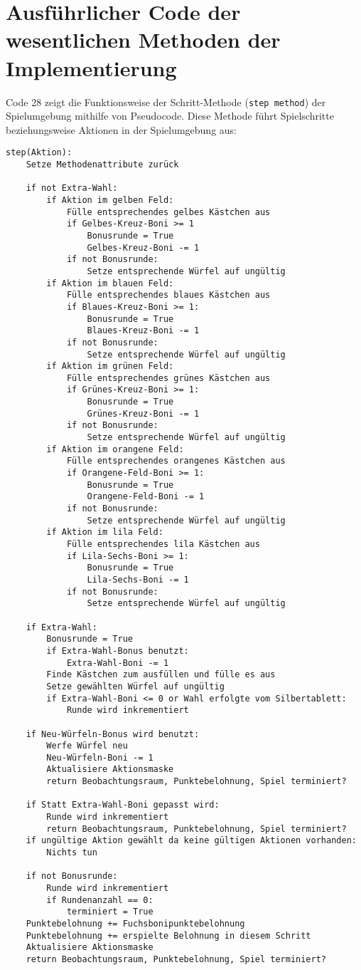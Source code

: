 \section{Ausführlicher Code der wesentlichen Methoden der Implementierung}
Code 28 zeigt die Funktionsweise der Schritt-Methode (\texttt{step method}) der Spielumgebung mithilfe von Pseudocode. Diese Methode führt Spielschritte beziehungsweise Aktionen in der Spielumgebung aus:
\vspace{0.5cm}
\begin{lstlisting}[caption={Schritt-Methode},morekeywords={Aktion}]
step(Aktion):
	Setze Methodenattribute zurück
	
	if not Extra-Wahl:
		if Aktion im gelben Feld:
			Fülle entsprechendes gelbes Kästchen aus
			if Gelbes-Kreuz-Boni >= 1
				Bonusrunde = True
				Gelbes-Kreuz-Boni -= 1
			if not Bonusrunde:
				Setze entsprechende Würfel auf ungültig
		if Aktion im blauen Feld:
			Fülle entsprechendes blaues Kästchen aus
			if Blaues-Kreuz-Boni >= 1:
				Bonusrunde = True
				Blaues-Kreuz-Boni -= 1
			if not Bonusrunde:
				Setze entsprechende Würfel auf ungültig
		if Aktion im grünen Feld:
			Fülle entsprechendes grünes Kästchen aus
			if Grünes-Kreuz-Boni >= 1:
				Bonusrunde = True
				Grünes-Kreuz-Boni -= 1
			if not Bonusrunde:
				Setze entsprechende Würfel auf ungültig
		if Aktion im orangene Feld:
			Fülle entsprechendes orangenes Kästchen aus
			if Orangene-Feld-Boni >= 1:
				Bonusrunde = True
				Orangene-Feld-Boni -= 1
			if not Bonusrunde:
				Setze entsprechende Würfel auf ungültig
		if Aktion im lila Feld:
			Fülle entsprechendes lila Kästchen aus
			if Lila-Sechs-Boni >= 1:
				Bonusrunde = True
				Lila-Sechs-Boni -= 1
			if not Bonusrunde:
				Setze entsprechende Würfel auf ungültig
	
	if Extra-Wahl:
		Bonusrunde = True
		if Extra-Wahl-Bonus benutzt:
			Extra-Wahl-Boni -= 1
		Finde Kästchen zum ausfüllen und fülle es aus
		Setze gewählten Würfel auf ungültig
		if Extra-Wahl-Boni <= 0 or Wahl erfolgte vom Silbertablett:
			Runde wird inkrementiert
	
	if Neu-Würfeln-Bonus wird benutzt:
		Werfe Würfel neu
		Neu-Würfeln-Boni -= 1
		Aktualisiere Aktionsmaske
		return Beobachtungsraum, Punktebelohnung, Spiel terminiert?
	
	if Statt Extra-Wahl-Boni gepasst wird:
		Runde wird inkrementiert
		return Beobachtungsraum, Punktebelohnung, Spiel terminiert?
	if ungültige Aktion gewählt da keine gültigen Aktionen vorhanden:
		Nichts tun
	
	if not Bonusrunde:
		Runde wird inkrementiert
		if Rundenanzahl == 0:
			terminiert = True
	Punktebelohnung += Fuchsbonipunktebelohnung
	Punktebelohnung += erspielte Belohnung in diesem Schritt
	Aktualisiere Aktionsmaske
	return Beobachtungsraum, Punktebelohnung, Spiel terminiert?		
\end{lstlisting}

